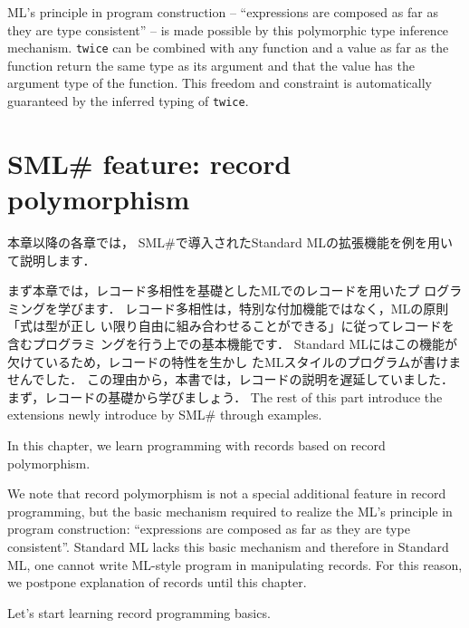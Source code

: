 \documentclass{jbook}
\newcommand{\txt}[2]{#2}
\newcommand{\smlsharp}{SML\#}
\begin{document}
	ML's principle in program construction -- ``expressions are
composed as far as they are type consistent'' -- is made possible by
this polymorphic type inference mechanism.
	{\tt twice} can be combined with any function and a value as far
as the function return the same type as its argument and that the value
has the argument type of the function.
	This freedom and constraint is automatically guaranteed by the
inferred typing of {\tt twice}.
\fi%

\chapter{\txt{\smlsharp{}の拡張機能：レコード多相性}{\smlsharp{} feature: record polymorphism}}
\label{chap:tutorialRecordpolymorphism}

\ifjp%
	本章以降の各章では，
\smlsharp{}で導入されたStandard MLの拡張機能を例を用いて説明します．

	まず本章では，レコード多相性を基礎としたMLでのレコードを用いたプ
ログラミングを学びます．
	レコード多相性は，特別な付加機能ではなく，MLの原則「式は型が正し
い限り自由に組み合わせることができる」に従ってレコードを含むプログラミ
ングを行う上での基本機能です．
	Standard MLにはこの機能が欠けているため，レコードの特性を生かし
たMLスタイルのプログラムが書けませんでした．
	この理由から，本書では，レコードの説明を遅延していました．
	まず，レコードの基礎から学びましょう．
\else%
	The rest of this part introduce the extensions newly introduce
by \smlsharp{} through examples.

	In this chapter, we learn programming with records based on 
record polymorphism.

	We note that record polymorphism is not a special additional
feature in record programming, but the basic mechanism required to
realize the ML's principle in program construction: ``expressions are
composed as far as they are type consistent''.
	Standard ML lacks this basic mechanism and therefore in Standard
ML, one cannot write ML-style program in manipulating records.
	For this reason, we postpone explanation of records until this
chapter.

	Let's start learning record programming basics.
\fi%
\end{document}
